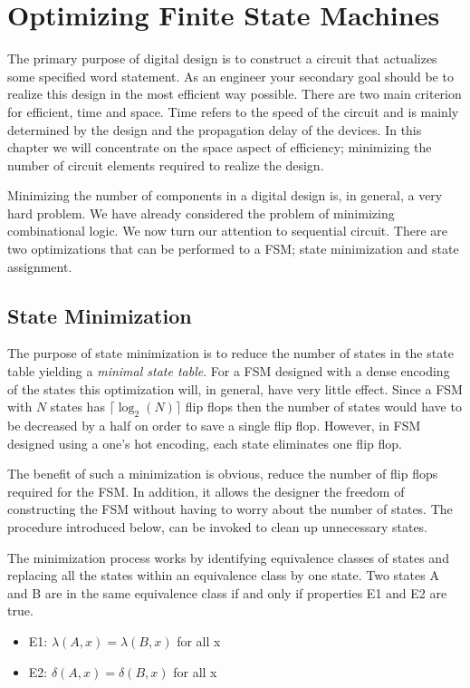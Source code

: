 \chapter{Optimizing Finite State Machines}
\label{chapter:Optimize Finite State Machines}
\graphicspath{ {./chapter11/Fig} }

The primary purpose of digital design is to construct a circuit that
actualizes some specified word statement.  As an engineer
your secondary goal should be to realize this design in the
most efficient way possible.  There are two main criterion for
efficient, time and space.  Time refers to the speed of the
circuit and is mainly determined by the design
and the propagation delay of the devices.  In
this chapter we will concentrate on the space aspect of
efficiency; minimizing the number of circuit elements required
to realize the design.

Minimizing the number of components in a digital design is,
in general, a very hard problem.  We have already considered
the problem of minimizing combinational logic.  We now turn
our attention to sequential circuit.  There are two optimizations
that can be performed to a FSM; state minimization and state
assignment.

\section{State Minimization}
The purpose of state minimization is to reduce the number
of states in the state table yielding a \textit{ minimal state
table}.  For a FSM designed with a dense
encoding of the states this optimization will, in general, have
very little effect. Since a FSM with $N$ states has
$\lceil \log_2(N) \rceil$ flip flops then the number of states
would have to be decreased by a half on order to save a single
flip flop.  However, in FSM designed using a one's hot encoding,
each state eliminates one flip flop.

The benefit of such a minimization is obvious, reduce the
number of flip flops required for the FSM.  In addition, it allows
the designer the freedom of constructing the FSM without
having to worry about the number of states.  The procedure
introduced below, can be invoked to clean up unnecessary states.

The minimization process works by identifying equivalence
classes of states and replacing all the states within
an equivalence class by one state.  Two states A and B are
in the same equivalence class if and only if properties
E1 and E2 are true.
\begin{itemize}
    \item E1: $\lambda (A,x) = \lambda (B,x)$ for all x
    \item E2: $\delta(A,x) = \delta(B,x)$ for all x
\end{itemize}


